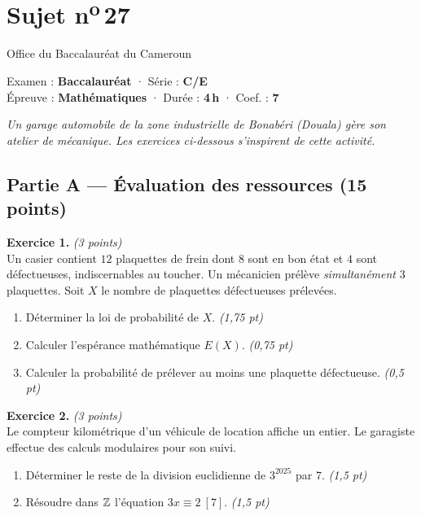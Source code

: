 \section{Sujet n\textsuperscript{o}\,27}
\noindent\begin{minipage}{0.5\linewidth}\footnotesize Office du Baccalauréat du Cameroun\end{minipage}%
\hfill\begin{minipage}{0.45\linewidth}\footnotesize\raggedleft Examen : \textbf{Baccalauréat} · Série : \textbf{C/E}\\
Épreuve : \textbf{Mathématiques} · Durée : \textbf{4\,h} · Coef. : \textbf{7}\end{minipage}
\par\smallskip{\color{onbo}\rule{\linewidth}{1pt}}

\noindent\textit{Un garage automobile de la zone industrielle de Bonabéri (Douala) gère son atelier
de mécanique. Les exercices ci-dessous s'inspirent de cette activité.}

\subsection*{Partie A — Évaluation des ressources \hfill (15 points)}

\noindent\textbf{Exercice 1.} \hfill\textit{(3 points)}\\
Un casier contient $12$ plaquettes de frein dont $8$ sont en bon état et $4$ sont
défectueuses, indiscernables au toucher. Un mécanicien prélève \emph{simultanément} $3$
plaquettes. Soit $X$ le nombre de plaquettes défectueuses prélevées.
\begin{enumerate}[label=\arabic*)]
\item Déterminer la loi de probabilité de $X$. \hfill\textit{(1,75 pt)}
\item Calculer l'espérance mathématique $E(X)$. \hfill\textit{(0,75 pt)}
\item Calculer la probabilité de prélever au moins une plaquette défectueuse. \hfill\textit{(0,5 pt)}
\end{enumerate}

\smallskip
\noindent\textbf{Exercice 2.} \hfill\textit{(3 points)}\\
Le compteur kilométrique d'un véhicule de location affiche un entier. Le garagiste effectue
des calculs modulaires pour son suivi.
\begin{enumerate}[label=\arabic*)]
\item Déterminer le reste de la division euclidienne de $3^{2025}$ par $7$. \hfill\textit{(1,5 pt)}
\item Résoudre dans $\mathbb{Z}$ l'équation $3x\equiv2\ [7]$. \hfill\textit{(1,5 pt)}
\end{enumerate}

